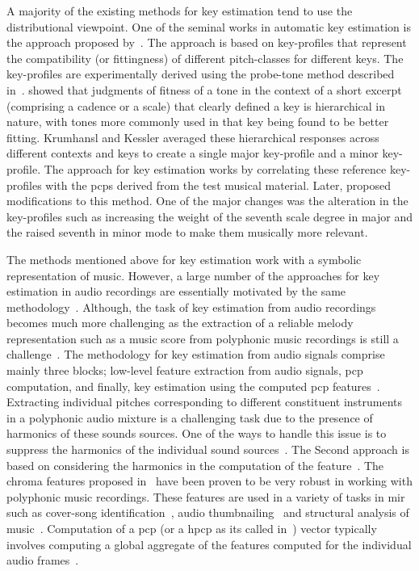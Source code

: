 A majority of the existing methods for key estimation tend to use the distributional viewpoint. One of the seminal works in automatic key estimation is the approach proposed by~\cite{KrumhanslKessler82,krumhansl2001cognitive}. The approach is based on key-profiles that represent the compatibility (or fittingness) of different pitch-classes for different keys. The key-profiles are experimentally derived using the probe-tone method described in~\cite{krumhansl1979quantification}. \cite{krumhansl1979quantification} showed that judgments of fitness of a tone in the context of a short excerpt (comprising a cadence or a scale) that clearly defined a key is hierarchical in nature, with tones more commonly used in that key being found to be better fitting. Krumhansl and Kessler averaged these hierarchical responses across different contexts and keys to create a single major key-profile and a minor key-profile. The approach for key estimation works by correlating these reference key-profiles with the \glspl{pcp} derived from the test musical material. Later, \cite{temperley1999s} proposed modifications to this method. One of the major changes was the alteration in the key-profiles such as increasing the weight of the seventh scale degree in major and the raised seventh in minor mode to make them musically more relevant. 

The methods mentioned above for key estimation work with a symbolic representation of music. However, a large number of the approaches for key estimation in audio recordings are essentially motivated by the same methodology~\citep{gomez2006tonal,pauws2004musical,peeters2006chroma}. Although, the task of key estimation from audio recordings becomes much more challenging as the extraction of a reliable melody representation such as a music score from polyphonic music recordings is still a challenge~\citep{gomez2006tonal}. The methodology for key estimation from audio signals comprise mainly three blocks; low-level feature extraction from audio signals, \gls{pcp} computation, and finally, key estimation using the computed \gls{pcp} features~\citep{peeters2006chroma}. Extracting individual pitches corresponding to different constituent instruments in a polyphonic audio mixture is a challenging task due to the presence of harmonics of these sounds sources. One of the ways to handle this issue is to suppress the harmonics of the individual sound sources~\citep{cremer2004a,peeters2006chroma}. The Second approach is based on considering the harmonics in the computation of the feature~\citep{gomez2006tonal,izmirli2005template}. The chroma features proposed in~\cite{gomez2006tonal} have been proven to be very robust in working with polyphonic music recordings. These features are used in a variety of tasks in \gls{mir} such as cover-song identification~\citep{joan_thesis}, audio thumbnailing~\citep{bartsch2001catch} and structural analysis of music~\citep{paulus2006music}. Computation of a \gls{pcp} (or a \gls{hpcp} as its called in~\cite{gomez2006tonal}) vector typically involves computing a global aggregate of the features computed for the individual audio frames~\citep{izmirli2005template,pauws2004musical}. 

